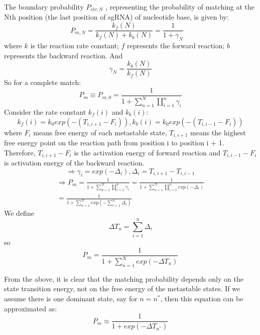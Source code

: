 The boundary probability $P_{clv;N}$ , representing the probability of matching at the Nth position (the last position of sgRNA) of nucleotide base, is given by:
\begin{equation}
P_{m,N}=\frac{k_f(N)}{k_f(N)+k_b(N)}=\frac{1}{1+\gamma_N} \quad
\end{equation}
where $k$ is the reaction rate constant; $f$ represents the forward reaction; $b$ represents the backward reaction. And 
\begin{equation}
 \gamma_N=\frac{k_b(N)}{k_f(N)}
\end{equation}
So for a complete match: 
\begin{equation}
P_{m} \equiv P_{m,0} = \frac{1}{1+\sum_{n=1}^N\coprod_{i=1}^n \gamma_i}
\end{equation}
Consider the rate constant $k_f(i)$ and $k_b(i)$:
\begin{equation}
k_f(i)=k_0exp(-(T_{i,i+1}-F_i)),k_b(i)=k_0exp(-(T_{i,i-1}-F_i))
\end{equation}
where $F_i$ means free energy of each metastable state, $T_{i,i+1}$ means the highest free energy point on the reaction path from position i to position i + 1. Therefore, $T_{i,i+1}-F_i$ is the activation energy of forward reaction and $T_{i,i-1}-F_i$ is activation energy of the backward reaction.
\begin{equation}
\Rightarrow \gamma_i=exp(-\Delta_i), \Delta_i=T_{i,i+1}-T_{i,i-1}
\end{equation}
\begin{equation}
\begin{aligned}
\Rightarrow P_{m} = \frac{1}{1+\sum_{n=1}^N\coprod_{i=1}^n \gamma_i}=\frac{1}{1+\sum_{n=1}^N\coprod_{i=1}^n exp(-\Delta_i)}\\=\frac{1}{1+\sum_{n=1}^N exp(-\sum_{i=1}^n\Delta_i)}
\end{aligned}
\end{equation}
We define $$\Delta T_n=\sum_{i=1}^n\Delta_i$$
so
\begin{equation} 
P_{m} =\frac{1}{1+\sum_{n=1}^N exp(-\Delta T_n)}
\end{equation}
	
From the above, it is clear that the matching probability depends only on the state transition energy, not on the free energy of the metastable states. If we assume there is one dominant state, say for $n = n^*$, then this equation can be approximated as:
\begin{equation}
 P_{m} \approx \frac{1}{1+exp(-\Delta T_{n^*})}
\end{equation}

